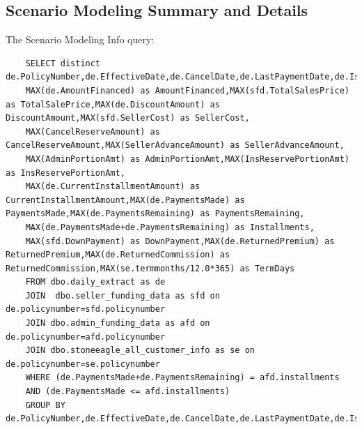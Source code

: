 \documentclass[titlepage]{article}
\begin{document}
\begin{appendices}
	\subsection{Scenario Modeling Summary and Details}
	The Scenario Modeling Info query:
	\label{appendix:sql3}
	\begin{verbatim}
	SELECT distinct de.PolicyNumber,de.EffectiveDate,de.CancelDate,de.LastPaymentDate,de.IsCancelled,de.FundCo,sfd.SellerName,
	MAX(de.AmountFinanced) as AmountFinanced,MAX(sfd.TotalSalesPrice) as TotalSalePrice,MAX(de.DiscountAmount) as DiscountAmount,MAX(sfd.SellerCost) as SellerCost,
	MAX(CancelReserveAmount) as CancelReserveAmount,MAX(SellerAdvanceAmount) as SellerAdvanceAmount,
	MAX(AdminPortionAmt) as AdminPortionAmt,MAX(InsReservePortionAmt) as InsReservePortionAmt,
	MAX(de.CurrentInstallmentAmount) as CurrentInstallmentAmount,MAX(de.PaymentsMade) as PaymentsMade,MAX(de.PaymentsRemaining) as PaymentsRemaining,
	MAX(de.PaymentsMade+de.PaymentsRemaining) as Installments,
	MAX(sfd.DownPayment) as DownPayment,MAX(de.ReturnedPremium) as ReturnedPremium,MAX(de.ReturnedCommission) as ReturnedCommission,MAX(se.termmonths/12.0*365) as TermDays
	FROM dbo.daily_extract as de
	JOIN  dbo.seller_funding_data as sfd on de.policynumber=sfd.policynumber
	JOIN dbo.admin_funding_data as afd on de.policynumber=afd.policynumber
	JOIN dbo.stoneeagle_all_customer_info as se on de.policynumber=se.policynumber
	WHERE (de.PaymentsMade+de.PaymentsRemaining) = afd.installments
	AND (de.PaymentsMade <= afd.installments)
	GROUP BY de.PolicyNumber,de.EffectiveDate,de.CancelDate,de.LastPaymentDate,de.IsCancelled,de.FundCo,sfd.SellerName;
	\end{verbatim}
	

\end{appendices}
\end{document}
